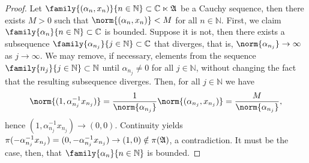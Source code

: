 \begin{proof}
    Let \(\family{(\alpha_n, x_n)}{n \in \mathbb{N}}\subset \mathbb{C} \ltimes \algebra{A}\) be a Cauchy sequence, then there exists \(M > 0\) such that \(\norm{(\alpha_n, x_n)} < M\) for all \(n \in \mathbb{N}\). First, we claim \(\family{\alpha_n}{n \in \mathbb{N}}\subset \mathbb{C}\) is bounded. Suppose it is not, then there exists a subsequence \(\family{\alpha_{n_j}}{j \in \mathbb{N}} \subset \mathbb{C}\) that diverges, that is, \(\norm{\alpha_{n_j}} \to \infty\) as \(j \to \infty\). We may remove, if necessary, elements from the sequence \(\family{n_j}{j \in \mathbb{N}}\subset \mathbb{N}\) until \(\alpha_{n_j} \neq 0\) for all \(j \in \mathbb{N}\), without changing the fact that the resulting subsequence diverges. Then, for all \(j \in \mathbb{N}\) we have
    \begin{equation*}
        \norm{(1, \alpha_{n_j}^{-1}x_{n_j})} = \frac1{\norm{\alpha_{n_j}}} \norm{(\alpha_{n_j}, x_{n_j})} = \frac{M}{\norm{\alpha_{n_j}}},
    \end{equation*}
    hence \((1, \alpha_{n_j}^{-1}x_{n_j}) \to (0,0)\). Continuity yields \(\pi(-\alpha_{n_j}^{-1} x_{n_j}) = (0, -\alpha_{n_j}^{-1} x_{n_j}) \to (1, 0) \notin \pi(\mathfrak{A})\), a contradiction. It must be the case, then, that \(\family{\alpha_n}{n \in \mathbb{N}}\) is bounded.


\end{proof}
